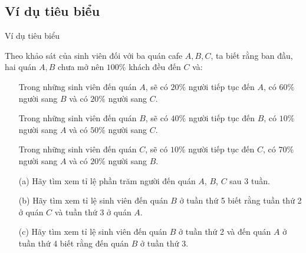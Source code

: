 \subsection{Ví dụ tiêu biểu}
\begin{frame}{Ví dụ tiêu biểu}
    \begin{mypro*}{}
        Theo khảo sát của sinh viên đối với ba quán cafe $A, B, C$, ta biết rằng ban đầu, hai quán $A, B$ chưa mở nên $100\%$ khách đều đến $C$ và:
    \begin{itemize}
        \item[\bullet] Trong những sinh viên đến quán $A$, sẽ có $20\%$ người tiếp tục đến $A$, có $60\%$ người sang $B$ và có $20\%$ người sang $C$.
        \item[\bullet] Trong những sinh viên đến quán $B$, sẽ có $40\%$ người tiếp tục đến $B$, có $10\%$ người sang $A$ và có $50\%$ người sang $C$.
        \item[\bullet] Trong những sinh viên đến quán $C$, sẽ có $10\%$ người tiếp tục đến $C$, có $70\%$ người sang $A$ và có $20\%$ người sang $B$.
    \end{itemize}

    \begin{itemize}
        \item[(a)] Hãy tìm xem tỉ lệ phần trăm người đến quán $A$, $B$, $C$ sau 3 tuần.
        \item[(b)] Hãy tìm xem tỉ lệ sinh viên đến quán $B$ ở tuần thứ 5 biết rằng tuần thứ 2 ở quán $C$ và tuần thứ 3 ở quán $A$.
        \item[(c)] Hãy tìm xem tỉ lệ sinh viên đến quán $B$ ở tuần thứ 2 và đến quán $A$ ở tuần thứ 4 biết rằng đến quán $B$ ở tuần thứ 3.
    \end{itemize}
    \end{mypro*}
\end{frame}
